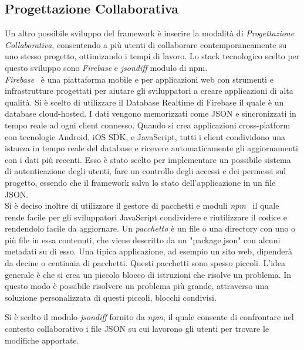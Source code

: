 \newpage

\subsection{Progettazione Collaborativa}
\label{sec:conclusions_section_2_sub_2}
Un altro possibile sviluppo del framework è inserire la modalità di \emph{Progettazione Collaborativa}, consentendo a più utenti
di collaborare contemporaneamente su uno stesso progetto, ottimizando i tempi di lavoro.
Lo stack tecnologico scelto per questo sviluppo sono
\emph{Firebase} e \emph{jsondiff} modulo di npm.\\
\emph{Firebase}~\cite{firebase} è una piattaforma mobile e per applicazioni web con strumenti e infrastrutture progettati
per aiutare gli sviluppatori a creare applicazioni di alta qualità. Si è scelto di utilizzare
il Database Realtime di Firebase  il quale è un database cloud-hosted. I dati vengono memorizzati come JSON e
sincronizzati in tempo reale ad ogni client connesso. Quando si crea applicazioni cross-platform con
tecnologie Android, iOS SDK, e JavaScript, tutti i client condividono una istanza in tempo reale del
database e ricevere automaticamente gli aggiornamenti con i dati più recenti.
Esso è stato scelto per implementare un possibile sistema di autenticazione degli utenti,
fare un controllo degli accessi e dei permessi sul progetto,
essendo che il framework salva lo stato dell'applicazione in un file JSON.\\
Si è deciso inoltre di utilizzare il gestore di pacchetti e moduli \emph{npm}~\cite{npm} il quale rende facile per gli sviluppatori
JavaScript condividere e riutilizzare il codice e rendendolo facile da aggiornare.
Un \emph{pacchetto} è un file o una directory con uno o più file in essa contenuti, che viene descritto da un "package.json"
con alcuni metadati su di esso. Una tipica applicazione, ad esempio un sito web, dipenderà da decine o centinaia di pacchetti.
Questi pacchetti sono spesso piccoli. L'idea generale è che si crea un piccolo blocco di istruzioni che risolve un problema.
In questo modo è possibile risolvere un problema più grande, attraverso una soluzione personalizzata di questi piccoli,
blocchi condivisi.
\newpage

Si è scelto il modulo \emph{jsondiff} fornito da \emph{npm}, il quale consente di confrontare nel contesto collaborativo
i file JSON su cui lavorono gli utenti per trovare le modifiche apportate.\\

